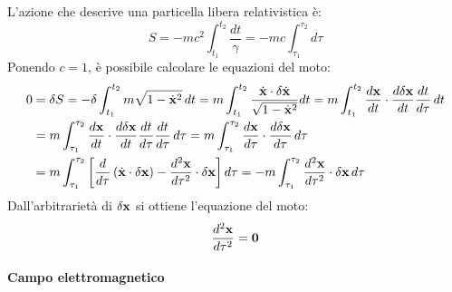 L'azione che descrive una particella libera relativistica è:
\begin{equation}
	S = - mc^2 \int_{t_1}^{t_2} \frac{dt}{\gamma} = -mc \int_{\tau_1}^{\tau_2} d\tau
	\label{eq:5.5}
\end{equation}
Ponendo $ c = 1 $, è possibile calcolare le equazioni del moto:
\begin{equation*}
	\begin{split}
		0
		&= \delta S = - \delta \int_{t_1}^{t_2} m \sqrt{1 - \dot{\mathbf{x}}^2} \,dt = m \int_{t_1}^{t_2} \frac{\dot{\mathbf{x}} \cdot \delta\dot{\mathbf{x}}}{\sqrt{1 - \dot{\mathbf{x}}^2}} dt = m \int_{t_1}^{t_2} \frac{d\mathbf{x}}{dt} \cdot \frac{d \delta\mathbf{x}}{dt} \frac{dt}{d\tau} \,dt\\
		&= m \int_{\tau_1}^{\tau_2} \frac{d\mathbf{x}}{dt} \cdot \frac{d \delta\mathbf{x}}{dt} \frac{dt}{d\tau} \frac{dt}{d\tau} \,d\tau = m \int_{\tau_1}^{\tau_2} \frac{d\mathbf{x}}{d\tau} \cdot \frac{d\delta\mathbf{x}}{d\tau} \,d\tau\\
		&= m \int_{\tau_1}^{\tau_2} \left[ \frac{d}{d\tau} \left( \dot{\mathbf{x}} \cdot \delta\mathbf{x} \right) - \frac{d^2\mathbf{x}}{d\tau^2} \cdot \delta\mathbf{x} \right] d\tau = - m \int_{\tau_1}^{\tau_2} \frac{d^2 \mathbf{x}}{d\tau^2} \cdot \delta\mathbf{x} \,d\tau
	\end{split}
\end{equation*}
Dall'arbitrarietà di $ \delta\mathbf{x} $ si ottiene l'equazione del moto:
\begin{equation}
	\frac{d^2 \mathbf{x}}{d\tau^2} = \mathbf{0}
	\label{eq:5.6}
\end{equation}

\paragraph{Campo elettromagnetico}

